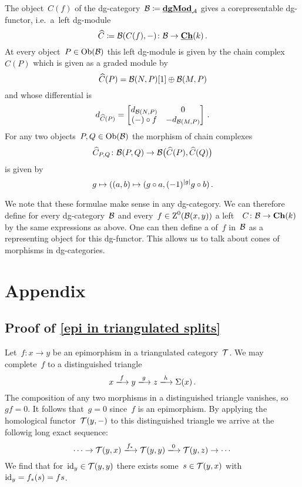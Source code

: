 \documentclass[a4paper,10pt]{scrartcl}
\begin{document}
The object~$C(f)$ of the dg-category~$\mathcal{B} \coloneqq \underline{\smash{\mathbf{dgMod}}}_{\mathcal{A}}$ gives a corepresentable dg-functor, i.e.\ a~left dg-module
\[
  \widehat{C}
  \coloneqq
  \mathcal{B}(C(f), -)
  \colon
  \mathcal{B}
  \to
  \underline{\mathbf{Ch}}(k) \,.
\]
At every object~$P \in \operatorname{Ob}(\mathcal{B})$ this left dg-module is given by the chain complex~$\widehat{C}(P)$ which is given as a graded module by
\[
  \widehat{C}(P)
  =
  \mathcal{B}(N,P)[1] \oplus \mathcal{B}(M,P)
\]
and whose differential is
\[
  d_{\widehat{C}(P)}
  =
  \begin{bmatrix}
    d_{\mathcal{B}(N,P)} &  0               \\
    (-) \circ f    & -d_{\mathcal{B}(M,P)}
  \end{bmatrix} \,.
\]
For any two objects~$P, Q \in \operatorname{Ob}(\mathcal{B})$ the morphism of chain complexes
\[
  \widehat{C}_{P,Q}
  \colon
  \mathcal{B}(P,Q)
  \to
  \mathcal{B}\bigl( \widehat{C}(P), \widehat{C}(Q) \bigr)
\]
is given by
\[
  g
  \mapsto
  ((a,b) \mapsto (g \circ a, (-1)^{\lvert g\rvert} g \circ b) \,.
\]

We note that these formulae make sense in any dg-category.
We can therefore define for every dg-category~$\Bcat$ and every~$f \in \operatorname{Z}^0(\mathcal{B}(x,y))$ a left~{\dgmodule{$\Bcat$}}~$C \colon \mathcal{B} \to \mathbf{Ch}(k)$ by the same expressions as above.
One can then define a  of~$f$ in~$\Bcat$ as a representing object for this dg-functor.
This allows us to talk about cones of morphisms in dg-categories.





\appendix





\section{Appendix}



\subsection{Proof of \cref{epi in triangulated splits}}
\label{epi in triangulated splits proof}

Let~$f \colon x \to y$ be an epimorphism in a triangulated category~$\mathcal{T}$.
We may complete~$f$ to a distinguished triangle
\[
  x
  \xlongto{f}
  y
  \xlongto{g}
  z
  \xlongto{h}
  \Sigma(x) \,.
\]
The composition of any two morphisms in a distinguished triangle vanishes, so~$gf = 0$.
It follows that~$g = 0$ since~$f$ is an epimorphism.
By applying the homological functor~$\mathcal{T}(y,-)$ to this distinguished triangle we arrive at the followig long exact sequence:
\[
  \dotsb
  \to
  \Tcat(y,x)
  \xlongto{f_*}
  \Tcat(y,y)
  \xlongto{0}
  \Tcat(y,z)
  \to
  \dotsb
\]
We find that for~$\mathrm{id}_y \in \mathcal{T}(y,y)$ there exists some~$s \in \mathcal{T}(y,x)$ with~$\mathrm{id}_y = f_*(s) = fs$.
\end{document}
